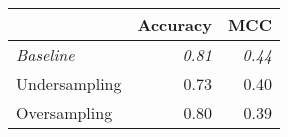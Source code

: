 \begin{tabular}{lrr}
\toprule
     & \textbf{Accuracy} & \textbf{MCC}  \\
\midrule
\textit{Baseline}           & \textit{0.81}     & \textit{0.44} \\
Undersampling               & 0.73              & 0.40          \\
Oversampling                & 0.80              & 0.39          \\
\bottomrule
\end{tabular}

